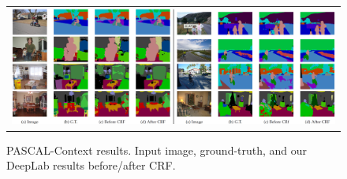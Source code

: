 \begin{figure}[!t]
  \centering
  \scalebox{0.9} {
  \begin{tabular}{c}
    \includegraphics[width=1\linewidth]{fig/pascal_context/results.jpg} \\
  \end{tabular}
  }
  \caption{PASCAL-Context results. Input image, ground-truth,
    and our DeepLab results before/after CRF.}
  \label{fig:pascal_context_val_results}
\end{figure}

